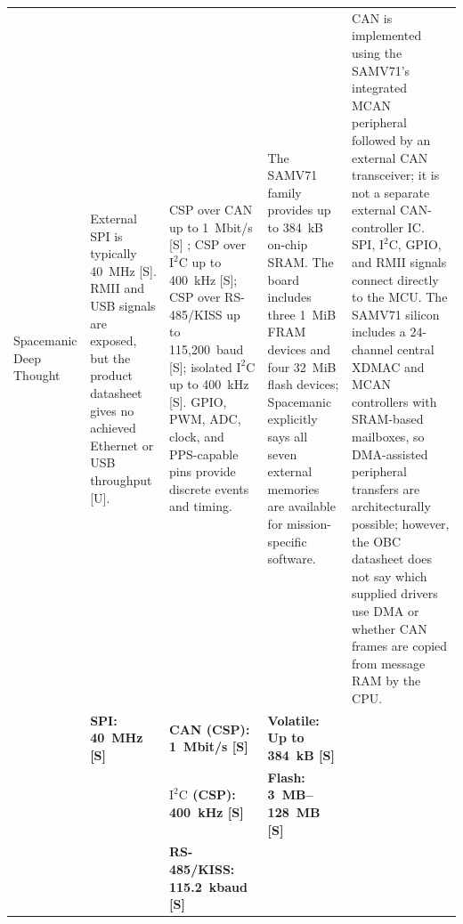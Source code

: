 \documentclass[10pt]{../datasheet}
\let\cite\citep
\begin{document}
\begin{landscape}
\begin{longtable}{|p{3.2cm}|p{4.5cm}|p{4.5cm}|p{4.5cm}|p{5.5cm}|}
    Spacemanic Deep Thought \cite{spacemanic_deep_thought_ds,
    microchip_sam_v71_ds, libcsp_basics}                               &
    External SPI is typically 40~MHz [S]. RMII and USB signals are exposed, but
    the product datasheet gives no achieved Ethernet or USB throughput [U].
                                                                       & CSP over CAN up to 1~Mbit/s [S] \cite{libcsp_basics}; CSP over
    $\text{I}^2\text{C}$ up to 400~kHz [S]; CSP over RS-485/KISS up to
    115,200~baud [S]; isolated $\text{I}^2\text{C}$ up to 400~kHz [S]. GPIO,
    PWM, ADC, clock, and PPS-capable pins provide discrete events and timing.
                                                                       & The SAMV71 family \cite{microchip_sam_v71_ds} provides up to 384~kB
    on-chip SRAM. The board includes three 1~MiB FRAM devices and four 32~MiB
    flash devices; Spacemanic explicitly says all seven external memories are
    available for mission-specific software.                           & CAN is
    implemented using the SAMV71's integrated MCAN peripheral followed by an
    external CAN transceiver; it is not a separate external CAN-controller IC.
    SPI, $\text{I}^2\text{C}$, GPIO, and RMII signals connect directly to the
    MCU. The SAMV71 \cite{microchip_sam_v71_ds} silicon includes a 24-channel
    central XDMAC and MCAN controllers with SRAM-based mailboxes, so
    DMA-assisted peripheral transfers are architecturally possible; however, the
    OBC datasheet does not say which supplied drivers use DMA or whether CAN
    frames are copied from message RAM by the CPU.
    \\
    \cline{2-5}
                                                                       & \textbf{SPI: 40~MHz [S]}
                                                                       & \textbf{CAN (CSP): 1~Mbit/s [S]}
                                                                       & \textbf{Volatile: Up to 384~kB [S]}                                        &                                                                                                \\
                                                                       &                                                                            & \textbf{$\text{I}^2\text{C}$ (CSP): 400~kHz [S]}
                                                                       & \textbf{Flash: 3~MB--128~MB [S]}                                           &                                                                                                \\
                                                                       &                                                                            & \textbf{RS-485/KISS: 115.2~kbaud [S]}            &                                           & \\ \hline\hline


\end{longtable}
\end{landscape}
\end{document}
